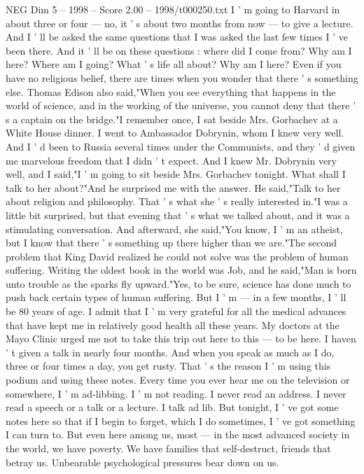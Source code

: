 \begin{textsample}{NEG Dim 5 – 1998 – Score 2.00 – 1998/t000250.txt}
I ' m going to Harvard in about three or four — no, it ' s about two months from now — to give a lecture.
And I ' ll be asked the same questions that I was asked the last few times I ' ve been there.
And it ' ll be on these questions : where did I come from?
Why am I here?
Where am I going?
What ' s life all about?
Why am I here?
Even if you have no religious belief, there are times when you wonder that there ' s something else.
Thomas Edison also said,"When you see everything that happens in the world of science, and in the working of the universe, you cannot deny that there ' s a captain on the bridge."I remember once, I sat beside Mrs.
Gorbachev at a White House dinner.
I went to Ambassador Dobrynin, whom I knew very well.
And I ' d been to Russia several times under the Communists, and they ' d given me marvelous freedom that I didn ' t expect.
And I knew Mr.
Dobrynin very well, and I said,"I ' m going to sit beside Mrs.
Gorbachev tonight.
What shall I talk to her about?"And he surprised me with the answer.
He said,"Talk to her about religion and philosophy.
That ' s what she ' s really interested in."I was a little bit surprised, but that evening that ' s what we talked about, and it was a stimulating conversation.
And afterward, she said,"You know, I ' m an atheist, but I know that there ' s something up there higher than we are."The second problem that King David realized he could not solve was the problem of human suffering.
Writing the oldest book in the world was Job, and he said,"Man is born unto trouble as the sparks fly upward."Yes, to be sure, science has done much to push back certain types of human suffering.
But I ' m — in a few months, I ' ll be 80 years of age.
I admit that I ' m very grateful for all the medical advances that have kept me in relatively good health all these years.
My doctors at the Mayo Clinic urged me not to take this trip out here to this — to be here.
I haven ' t given a talk in nearly four months.
And when you speak as much as I do, three or four times a day, you get rusty.
That ' s the reason I ' m using this podium and using these notes.
Every time you ever hear me on the television or somewhere, I ' m ad-libbing.
I ' m not reading.
I never read an address.
I never read a speech or a talk or a lecture.
I talk ad lib.
But tonight, I ' ve got some notes here so that if I begin to forget, which I do sometimes, I ' ve got something I can turn to.
But even here among us, most — in the most advanced society in the world, we have poverty.
We have families that self-destruct, friends that betray us.
Unbearable psychological pressures bear down on us.

\end{textsample}
